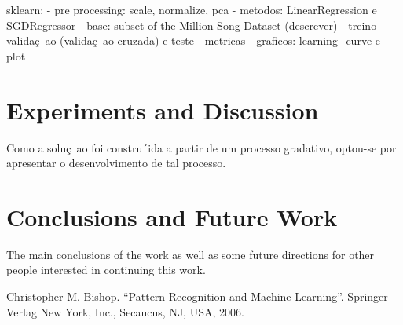 \documentclass[conference]{IEEEtran}
\begin{document}
sklearn:
- pre processing: scale, normalize, pca
- metodos: LinearRegression e SGDRegressor
- base: subset of the Million Song Dataset (descrever)
- treino validaç~ao (validaç~ao cruzada) e teste
- metricas
- graficos: learning_curve e plot

\section{Experiments and Discussion}

Como a soluç~ao foi constru´ida a partir de um processo gradativo, optou-se por apresentar o desenvolvimento de tal processo.


\section{Conclusions and Future Work}

The main conclusions of the work as well as some future directions for other people interested in continuing this work. 

\begin{thebibliography}{00}
 Christopher M. Bishop. ``Pattern Recognition and Machine Learning''. Springer-Verlag New York, Inc., Secaucus, NJ, USA, 2006. 
\end{thebibliography}
\end{document}
